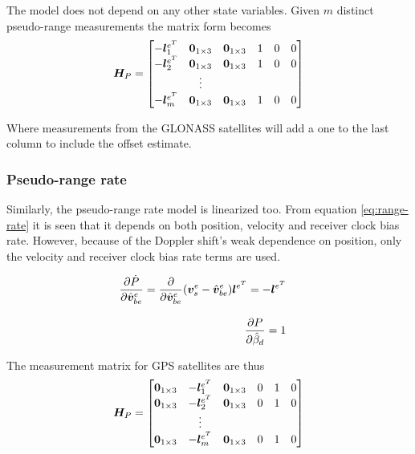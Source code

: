    The model does not depend on any other state variables. Given $m$ distinct pseudo-range measurements the matrix form becomes
    \begin{equation}
        \bm{H}_P =
        \begin{bmatrix}
            -\bm{l}_1^{e^T} & \bm{0}_{1\times3} & \bm{0}_{1\times3} & 1 & 0 & 0\\
            -\bm{l}_2^{e^T} & \bm{0}_{1\times3} & \bm{0}_{1\times3} & 1 & 0 & 0\\
            &\vdots\\
            -\bm{l}_m^{e^T} & \bm{0}_{1\times3} & \bm{0}_{1\times3} & 1 & 0 & 0\\
        \end{bmatrix}
    \end{equation}
    
    Where measurements from the GLONASS satellites will add a one to the last column to include the offset estimate.
    
    \subsubsection*{Pseudo-range rate}
    Similarly, the pseudo-range rate model is linearized too. From equation \ref{eq:range-rate} it is seen that it depends on both position, velocity and receiver clock bias rate. However, because of the Doppler shift's weak dependence on position, only the velocity and receiver clock bias rate terms are used.
    
    \begin{align}
        \begin{split}
            \frac{\partial \dot{P}}{\partial \hat{\bm{v}}^e_{be}}   & = \frac{\partial }{\partial \hat{\bm{v}}^e_{be}}(\bm{v}^e_s - \hat{\bm{v}}^e_{be})\bm{l}^{e^T} = -\bm{l}^{e^T}
        \end{split}
        \\[2ex]
        \begin{split}
            \frac{\partial P}{\partial {\hat{\beta}_d}}   & = 1
        \end{split}
    \end{align}
    
    The measurement matrix for GPS satellites are thus
    \begin{equation}
        \bm{H}_P =
        \begin{bmatrix}
            \bm{0}_{1\times3} & -\bm{l}_1^{e^T} & \bm{0}_{1\times3} & 0 & 1 & 0\\
            \bm{0}_{1\times3} & -\bm{l}_2^{e^T} & \bm{0}_{1\times3} & 0 & 1 & 0\\
            &\vdots\\
            \bm{0}_{1\times3} & -\bm{l}_m^{e^T} & \bm{0}_{1\times3} & 0 & 1 & 0\\
        \end{bmatrix}
    \end{equation}

